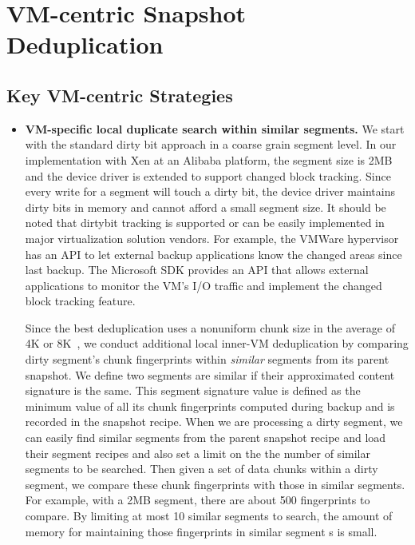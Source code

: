 \section{VM-centric Snapshot Deduplication}
\label{sect:dedupe}

\subsection{Key VM-centric  Strategies}
\label{sect:vc-strategies}
\begin{itemize}
\item \textbf{VM-specific local duplicate search within similar segments.}
We start with the standard dirty bit approach in a coarse grain segment level.
In our implementation with Xen at an Alibaba platform, the segment size is 2MB
and  the device driver is extended to support  changed block tracking. 
Since every write for a segment will touch a dirty bit, the device driver maintains dirty bits in memory
and cannot afford a small segment  size.
It should be noted that dirtybit tracking is supported or can be easily implemented in 
major virtualization solution vendors. For example,
the VMWare hypervisor has an API to let external backup applications know 
the changed areas since last backup. 
The Microsoft SDK provides an API that allows external applications to monitor 
the VM's I/O traffic and implement  the changed block tracking feature.

Since the best deduplication uses a nonuniform chunk size 
in the average of 4K or 8K~\cite{??},  
we conduct additional local inner-VM deduplication by comparing
dirty segment's chunk fingerprints within  {\em similar} segments from its parent snapshot. 
We define two segments are similar if their approximated content signature is the same.
This segment signature value is defined as the minimum value of all its chunk fingerprints 
computed during backup and is recorded in the snapshot recipe.
When we are processing a dirty segment,
we can easily find similar segments from the
parent snapshot recipe and load their segment recipes and also set a limit on the 
the number of  similar segments to be  searched. 
 Then 
given a set of data chunks within a dirty segment,  we compare  these chunk fingerprints
with those in similar segments.  
For example, with a 2MB segment, there are about 500 fingerprints to compare. By limiting at most 10 similar
segments to search,
the amount of memory for maintaining those fingerprints in similar segment s is small.


\end{itemize}
